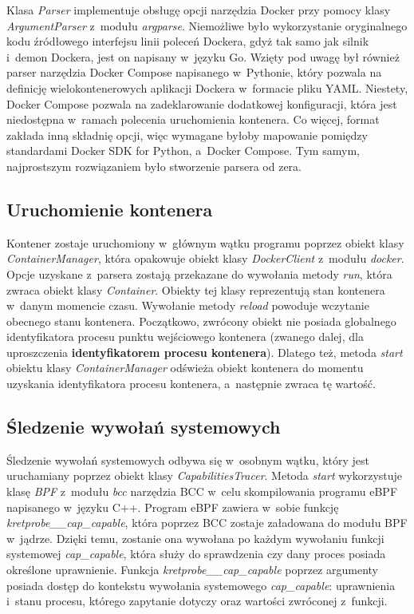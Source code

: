Klasa \textit{Parser} implementuje obsługę opcji narzędzia Docker przy pomocy klasy \textit{ArgumentParser} z~modułu \textit{argparse}. Niemożliwe było wykorzystanie oryginalnego kodu źródłowego interfejsu linii poleceń Dockera, gdyż tak samo jak silnik i~demon Dockera, jest on napisany w~języku Go. Wzięty pod uwagę był również parser narzędzia Docker Compose napisanego w~Pythonie, który pozwala na definicję wielokontenerowych aplikacji Dockera w~formacie pliku YAML. Niestety, Docker Compose pozwala na zadeklarowanie dodatkowej konfiguracji, która jest niedostępna w~ramach polecenia uruchomienia kontenera. Co więcej, format zakłada inną składnię opcji, więc wymagane byłoby mapowanie pomiędzy standardami Docker SDK for Python, a~Docker Compose. Tym samym, najprostszym rozwiązaniem było stworzenie parsera od zera.

\subsection{Uruchomienie kontenera}

Kontener zostaje uruchomiony w~głównym wątku programu poprzez obiekt klasy \textit{ContainerManager}, która opakowuje obiekt klasy \textit{DockerClient} z~modułu \textit{docker}. Opcje uzyskane z~parsera zostają przekazane do wywołania metody \textit{run}, która zwraca obiekt klasy \textit{Container}. Obiekty tej klasy reprezentują stan kontenera w~danym momencie czasu. Wywołanie metody \textit{reload} powoduje wczytanie obecnego stanu kontenera. Początkowo, zwrócony obiekt nie posiada globalnego identyfikatora procesu punktu wejściowego kontenera (zwanego dalej, dla uproszczenia \textbf{identyfikatorem procesu kontenera}). Dlatego też, metoda \textit{start} obiektu klasy \textit{ContainerManager} odświeża obiekt kontenera do momentu uzyskania identyfikatora procesu kontenera, a~następnie zwraca tę wartość.

\subsection{Śledzenie wywołań systemowych}

Śledzenie wywołań systemowych odbywa się w~osobnym wątku, który jest uruchamiany poprzez obiekt klasy \textit{CapabilitiesTracer}. Metoda \textit{start} wykorzystuje klasę \textit{BPF} z~modułu \textit{bcc} narzędzia BCC w~celu skompilowania programu eBPF napisanego w~języku C++. Program eBPF zawiera w~sobie funkcję \textit{kretprobe__cap_capable}, która poprzez BCC zostaje załadowana do modułu BPF w~jądrze. Dzięki temu, zostanie ona wywołana po każdym wywołaniu funkcji systemowej \textit{cap_capable}, która służy do sprawdzenia czy dany proces posiada określone uprawnienie. Funkcja \textit{kretprobe__cap_capable} poprzez argumenty posiada dostęp do kontekstu wywołania systemowego \textit{cap_capable}: uprawnienia i~stanu procesu, którego zapytanie dotyczy oraz wartości zwróconej z~funkcji.

